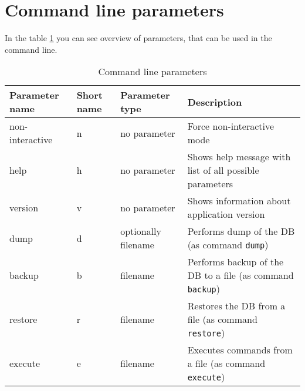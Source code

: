 \documentclass[deska]{subfiles}
\begin{document}
\section{Command line parameters}

In the table \ref{tab:cmdlineparams} you can see overview of parameters, that can be used in the command line.

\begin{longtable}{ l | l | l | p{7cm} }
    \caption{Command line parameters} \\
    Parameter name & Short name & Parameter type & Description \\
    \hline
    \endhead
\label{tab:cmdlineparams}
    non-interactive & n & no parameter & Force non-interactive mode \\
    help & h & no parameter & Shows help message with list of all possible parameters \\
    version & v & no parameter & Shows information about application version \\
    dump & d & optionally filename & Performs dump of the DB (as command {\tt dump}) \\
    backup & b & filename & Performs backup of the DB to a file (as command {\tt backup}) \\
    restore & r & filename & Restores the DB from a file (as command {\tt restore}) \\
    execute & e & filename & Executes commands from a file (as command {\tt execute}) \\
    \hline
\end{longtable}
\end{document}
